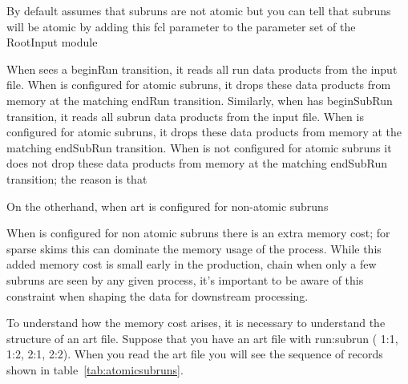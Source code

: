 By default \art assumes that subruns are not atomic
but you can tell \art that subruns will be atomic by adding this fcl
parameter to the parameter set of the RootInput module


When \art sees a beginRun transition, it reads all run data products from the input file.
When \art is configured for atomic subruns, it drops these data products
from memory at the matching endRun transition.
Similarly, when \art has beginSubRun transition, it reads all subrun data products from the input file.
When \art is configured for atomic subruns, it drops these data products
from memory at the matching endSubRun transition.
When \art is not configured for atomic subruns it does not drop these data products from
memory at the matching endSubRun transition; the reason is that 

On the otherhand, when art is configured for non-atomic subruns

When \art is configured for non atomic subruns there is an extra memory cost;
for sparse skims this can dominate the memory usage of the process.
While this added memory cost is small early in the production, chain when
only a few subruns are seen by any given process, it's important to be
aware of this constraint when shaping the data for downstream processing.

To understand how the memory cost arises,
it is necessary to understand the structure of an art file.
Suppose that you have an art file with run:subrun ( 1:1, 1:2, 2:1, 2:2).
When you read the art file you will see the sequence of records shown
in table~\ref{tab:atomicsubruns}.

